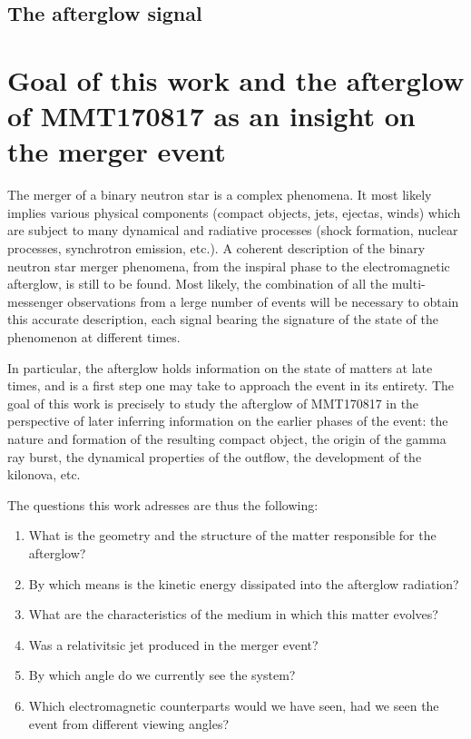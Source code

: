 \subsection{The afterglow signal}


\section{Goal of this work and the afterglow of MMT170817 as an insight on the merger event}

The merger of a binary neutron star is a complex phenomena. It most likely implies various physical components (compact objects, jets, ejectas, winds) which are subject to many dynamical and radiative processes (shock formation, nuclear processes, synchrotron emission, etc.). A coherent description of the binary neutron star merger phenomena, from the inspiral phase to the electromagnetic afterglow, is still to be found. Most likely, the combination of all the multi-messenger observations from a lerge number of events will be necessary to obtain this accurate description, each signal bearing the signature of the state of the phenomenon at different times.

In particular, the afterglow holds information on the state of matters at late times, and is a first step one may take to approach the event in its entirety. The goal of this work is precisely to study the afterglow of MMT170817 in the perspective of later inferring information on the earlier phases of the event: the nature and formation of the resulting compact object, the origin of the gamma ray burst, the dynamical properties of the outflow, the development of the kilonova, etc.

The questions this work adresses are thus the following:

\begin{enumerate}
	\item What is the geometry and the structure of the matter responsible for the afterglow?
	\item By which means is the kinetic energy dissipated into the afterglow radiation?
	\item What are the characteristics of the medium in which this matter evolves?
	\item Was a relativitsic jet produced in the merger event?
	\item By which angle do we currently see the system?
	\item Which electromagnetic counterparts would we have seen, had we seen the event from different viewing angles?
\end{enumerate}

